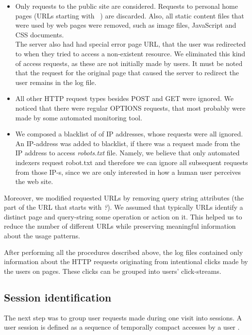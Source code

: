 \documentclass[12pt, english,a4paper]{article}
\begin{document}
\begin{itemize}
\item Only requests to the public site are considered. Requests to personal home pages (URLs starting with ~) are discarded. Also, all static content files that were used by web pages were removed, such as image files, JavaScript and CSS documents. \\ The server also had had special error page URL, that the user was redirected to when they tried to access a non-existent resource. We eliminated this kind of access requests, as these are not initially made by users. It must be noted that the request for the original page that caused the server to redirect the user remains in the log file.
  
\item All other HTTP request types besides POST and GET were ignored. We noticed that there were regular OPTIONS requests, that most probably were made by some automated monitoring tool. 
  
\item We composed a blacklist of of IP addresses, whose requests were all ignored. An IP-address was added to blacklist, if there was a request made from the IP address to access \emph{robots.txt} file. Namely, we believe that only automated indexers request robot.txt and therefore we can ignore all subsequent requests from those IP-s, since we are only interested in how a human user perceives the web site. 
\end{itemize}


Moreover, we modified requested URLs by removing query string attributes (the part of the URL that starts with \emph{?}). We assumed that typically URLs identify a distinct page and query-string some operation or action on it. This helped us to reduce the number of different URLs while preserving meaningful information about the usage patterns.

After performing all the procedures described above, the log files contained only information about the HTTP requests originating from intentional clicks made by the users on pages. These clicks can be grouped into users' click-streams.











\subsection{Session identification}
The next step was to group user requests made during one visit into sessions. A user session is defined as a sequence of temporally compact accesses by a user \cite{on_mining_logs}.
\end{document}
